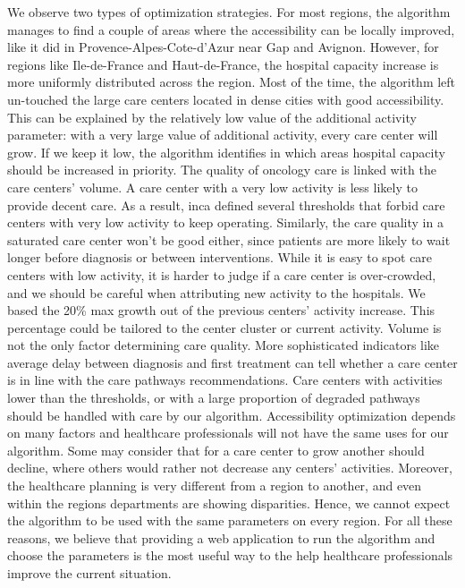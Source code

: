 We observe two types of optimization strategies. For most regions, the algorithm
manages to find a couple of areas where the accessibility can be locally
improved, like it did in Provence-Alpes-Cote-d'Azur near Gap and Avignon.
However, for regions like Ile-de-France and Haut-de-France, the hospital
capacity increase is more uniformly distributed across the region. Most of the
time, the algorithm left un-touched the large care centers located in dense
cities with good accessibility. This can be explained by the relatively low
value of the additional activity parameter: with a very large value of
additional activity, every care center will grow. If we keep it low, the
algorithm identifies in which areas hospital capacity should be increased in
priority. The quality of oncology care is linked with the care centers' volume.
A care center with a very low activity is less likely to provide decent care. As a
result, \ac{inca} defined several thresholds that forbid care centers with
very low activity to keep operating. Similarly, the care quality in a saturated
care center won't be good either, since patients are more likely to wait longer
before diagnosis or between interventions. While it is easy to spot care centers
with low activity, it is harder to judge if a care center is over-crowded, and
we should be careful when attributing new activity to the hospitals. We based
the 20\% max growth out of the previous centers' activity increase. This
percentage could be tailored to the center cluster or current activity. Volume
is not the only factor determining care quality. More sophisticated indicators
like average delay between diagnosis and first treatment can tell whether a care
center is in line with the care pathways recommendations. Care centers with
activities lower than the thresholds, or with a large proportion of degraded
pathways should be handled with care by our algorithm. Accessibility
optimization depends on many factors and healthcare professionals will not have
the same uses for our algorithm. Some may consider that for a care center to
grow another should decline, where others would rather not decrease any centers'
activities. Moreover, the healthcare planning is very different from a region to
another, and even within the regions departments are showing disparities. Hence,
we cannot expect the algorithm to be used with the same parameters on every
region. For all these reasons, we believe that providing a web application to
run the algorithm and choose the parameters is the most useful way to the help
healthcare professionals improve the current situation.
